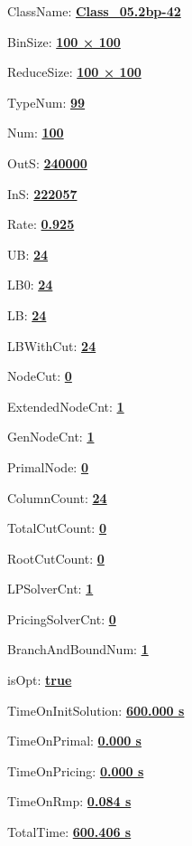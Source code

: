 \documentclass[11pt]{article}
\begin{document}
\pagestyle{empty}


ClassName: \underline{\textbf{Class_05.2bp-42}}
\par
BinSize: \underline{\textbf{100 × 100}}
\par
ReduceSize: \underline{\textbf{100 × 100}}
\par
TypeNum: \underline{\textbf{99}}
\par
Num: \underline{\textbf{100}}
\par
OutS: \underline{\textbf{240000}}
\par
InS: \underline{\textbf{222057}}
\par
Rate: \underline{\textbf{0.925}}
\par
UB: \underline{\textbf{24}}
\par
LB0: \underline{\textbf{24}}
\par
LB: \underline{\textbf{24}}
\par
LBWithCut: \underline{\textbf{24}}
\par
NodeCut: \underline{\textbf{0}}
\par
ExtendedNodeCnt: \underline{\textbf{1}}
\par
GenNodeCnt: \underline{\textbf{1}}
\par
PrimalNode: \underline{\textbf{0}}
\par
ColumnCount: \underline{\textbf{24}}
\par
TotalCutCount: \underline{\textbf{0}}
\par
RootCutCount: \underline{\textbf{0}}
\par
LPSolverCnt: \underline{\textbf{1}}
\par
PricingSolverCnt: \underline{\textbf{0}}
\par
BranchAndBoundNum: \underline{\textbf{1}}
\par
isOpt: \underline{\textbf{true}}
\par
TimeOnInitSolution: \underline{\textbf{600.000 s}}
\par
TimeOnPrimal: \underline{\textbf{0.000 s}}
\par
TimeOnPricing: \underline{\textbf{0.000 s}}
\par
TimeOnRmp: \underline{\textbf{0.084 s}}
\par
TotalTime: \underline{\textbf{600.406 s}}
\par
\newpage


\end{document}
